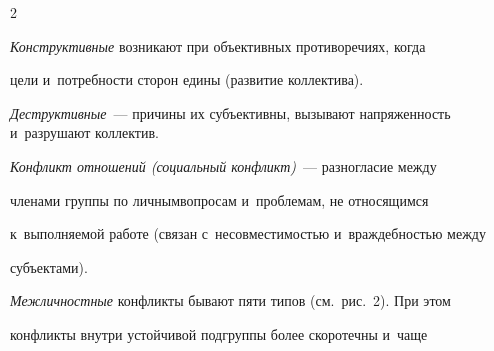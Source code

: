 \begin{multicols}{2}
  

  \textit{Конструктивные} возникают при объективных противоречиях, когда 

цели и~потребности сторон едины (развитие коллектива). 

\textit{Деструктивные}~--- причины их субъективны, вызывают напряженность и~разрушают коллектив.

  

  \textit{Конфликт отношений (социальный конфликт)}~--- разногласие между 

членами группы по личным\linebreak вопросам и~проблемам, не относящимся 

к~вы\-пол\-ня\-емой работе (связан с~несовместимостью и~враждебностью между 

субъектами). 







  \textit{Межличностные} конфликты бывают пяти типов (см.\ рис.~2). При этом 

конфликты внутри устойчивой подгруппы более скоротечны и~чаще\linebreak\vspace*{-12pt}



\pagebreak



\end{multicols}



